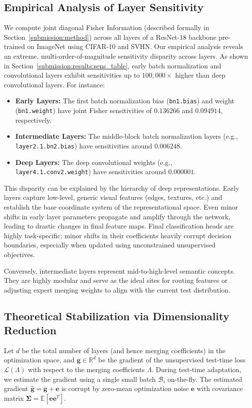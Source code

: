 \documentclass{article}
\theoremstyle{plain}
\theoremstyle{definition}
\theoremstyle{remark}
\begin{document}
\subsection{Empirical Analysis of Layer Sensitivity}
We compute joint diagonal Fisher Information (described formally in Section~\ref{submission:method}) across all layers of a ResNet-18 backbone pre-trained on ImageNet using CIFAR-10 and SVHN. Our empirical analysis reveals an extreme, multi-order-of-magnitude sensitivity disparity across layers. As shown in Section~\ref{submission:results:sens_table}, early batch normalization and convolutional layers exhibit sensitivities up to $100,000\times$ higher than deep convolutional layers. For instance:
\begin{itemize}
    \item \textbf{Early Layers:} The first batch normalization bias (\texttt{bn1.bias}) and weight (\texttt{bn1.weight}) have joint Fisher sensitivities of $0.136266$ and $0.094914$, respectively.
    \item \textbf{Intermediate Layers:} The middle-block batch normalization layers (e.g., \texttt{layer2.1.bn2.bias}) have sensitivities around $0.006248$.
    \item \textbf{Deep Layers:} The deep convolutional weights (e.g., \texttt{layer4.1.conv2.weight}) have sensitivities around $0.000001$.
\end{itemize}

This disparity can be explained by the hierarchy of deep representations. Early layers capture low-level, generic visual features (edges, textures, etc.) and establish the base coordinate system of the representational space. Even minor shifts in early layer parameters propagate and amplify through the network, leading to drastic changes in final feature maps. Final classification heads are highly task-specific; minor shifts in their coefficients heavily corrupt decision boundaries, especially when updated using unconstrained unsupervised objectives.

Conversely, intermediate layers represent mid-to-high-level semantic concepts. They are highly modular and serve as the ideal sites for routing features or adjusting expert merging weights to align with the current test distribution.

\subsection{Theoretical Stabilization via Dimensionality Reduction}
Let $d$ be the total number of layers (and hence merging coefficients) in the optimization space, and $\mathbf{g} \in \mathbb{R}^d$ be the gradient of the unsupervised test-time loss $\mathcal{L}(\Lambda)$ with respect to the merging coefficients $\Lambda$. During test-time adaptation, we estimate the gradient using a single small batch $\mathcal{B}_i$ on-the-fly. The estimated gradient $\hat{\mathbf{g}} = \mathbf{g} + \mathbf{e}$ is corrupt by zero-mean optimization noise $\mathbf{e}$ with covariance matrix $\mathbf{\Sigma} = \mathbb{E}[\mathbf{e}\mathbf{e}^T]$.
\end{document}
